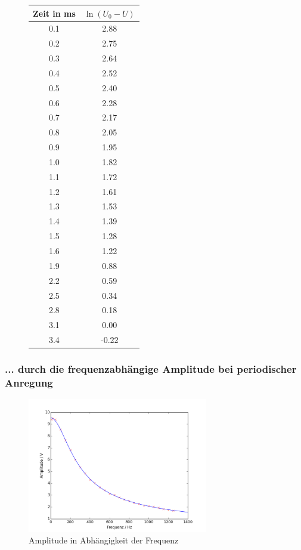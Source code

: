 \begin{figure}[h!]
	\centering
	\begin{tabular}{c|c}
		Zeit in \si{\milli\second}& $\ln(U_0-U)$ \\
		\hline
		0.1 &  2.88 \\
		0.2 &  2.75 \\
		0.3 &  2.64 \\
		0.4 &  2.52 \\
		0.5 &  2.40  \\
		0.6 &  2.28 \\
		0.7 &  2.17 \\
		0.8 &  2.05 \\
		0.9 &  1.95 \\
		1.0   &  1.82 \\
		1.1 &  1.72 \\
		1.2 &  1.61 \\
		1.3 &  1.53 \\
		1.4 &  1.39 \\
		1.5 &  1.28 \\
		1.6 &  1.22 \\
		1.9 &  0.88 \\
		2.2 &  0.59 \\
		2.5 &  0.34 \\
		2.8 &  0.18 \\
		3.1 &  0.00    \\
		3.4 & -0.22 \\
	\end{tabular}
	\label{tab:aufladekurve}
\end{figure}



\clearpage
\subsubsection{... durch die frequenzabhängige Amplitude bei periodischer Anregung}
\begin{figure}[h!]
\centering
\includegraphics[width=0.7\textwidth]{Amplitude.png}
\caption{Amplitude in Abhängigkeit der Frequenz}
\label{fig:amplitude}
\end{figure} 

